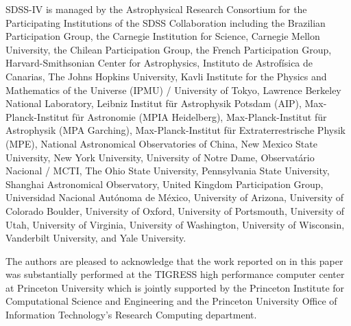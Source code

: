 \documentclass[modern, letterpaper]{aastex62}
\newcommand{\apogee}{\project{\acronym{APOGEE}}}
\newcommand{\sdssiv}{\project{\acronym{SDSS-IV}}}
\begin{document}
SDSS-IV is managed by the Astrophysical Research Consortium for the
Participating Institutions of the SDSS Collaboration including the
Brazilian Participation Group, the Carnegie Institution for Science,
Carnegie Mellon University, the Chilean Participation Group, the French Participation Group, Harvard-Smithsonian Center for Astrophysics,
Instituto de Astrof\'isica de Canarias, The Johns Hopkins University,
Kavli Institute for the Physics and Mathematics of the Universe (IPMU) /
University of Tokyo, Lawrence Berkeley National Laboratory,
Leibniz Institut f\"ur Astrophysik Potsdam (AIP),
Max-Planck-Institut f\"ur Astronomie (MPIA Heidelberg),
Max-Planck-Institut f\"ur Astrophysik (MPA Garching),
Max-Planck-Institut f\"ur Extraterrestrische Physik (MPE),
National Astronomical Observatories of China, New Mexico State University,
New York University, University of Notre Dame,
Observat\'ario Nacional / MCTI, The Ohio State University,
Pennsylvania State University, Shanghai Astronomical Observatory,
United Kingdom Participation Group,
Universidad Nacional Aut\'onoma de M\'exico, University of Arizona,
University of Colorado Boulder, University of Oxford, University of Portsmouth,
University of Utah, University of Virginia, University of Washington, University of Wisconsin,
Vanderbilt University, and Yale University.

The authors are pleased to acknowledge that the work reported on in this
paper was substantially performed at the TIGRESS high performance computer
center at Princeton University which is jointly supported by the Princeton
Institute for Computational Science and Engineering and the Princeton
University Office of Information Technology's Research Computing department.


\facility{\sdssiv, \apogee}




\clearpage
\end{document}
